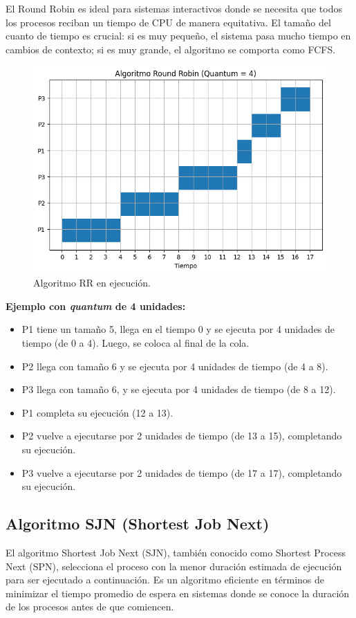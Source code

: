 El Round Robin es ideal para sistemas interactivos donde se necesita que todos los procesos reciban un tiempo de CPU de manera equitativa. El tamaño del cuanto de tiempo es crucial: si es muy pequeño, el sistema pasa mucho tiempo en cambios de contexto; si es muy grande, el algoritmo se comporta como FCFS.
\begin{figure}[H] \centering \includegraphics[width=0.8\linewidth]{Imagenes/rr_ejecucion.png} 
	\caption{Algoritmo RR en ejecución.} 
\end{figure}

\textbf{Ejemplo con \textit{quantum} de 4 unidades:}
\begin{itemize}
	\item 
	P1 tiene un tamaño 5, llega en el tiempo 0 y se ejecuta por 4 unidades de tiempo (de 0 a 4). Luego, se coloca al final de la cola.
	\item 	P2 llega con tamaño 6 y se ejecuta por 4 unidades de tiempo (de 4 a 8).
	\item 	P3 llega con tamaño 6, y se ejecuta por 4 unidades de tiempo (de 8 a 12).
	\item 	
	P1 completa su ejecución (12 a 13).
	\item P2 vuelve a ejecutarse por 2 unidades de tiempo (de 13 a 15), completando su ejecución.
	\item P3 vuelve a ejecutarse por 2 unidades de tiempo (de 17 a 17), completando su ejecución.
	
\end{itemize}

\subsection{Algoritmo SJN (Shortest Job Next)}

El algoritmo Shortest Job Next (SJN), también conocido como Shortest Process Next (SPN), selecciona el proceso con la menor duración estimada de ejecución para ser ejecutado a continuación. Es un algoritmo eficiente en términos de minimizar el tiempo promedio de espera en sistemas donde se conoce la duración de los procesos antes de que comiencen.

